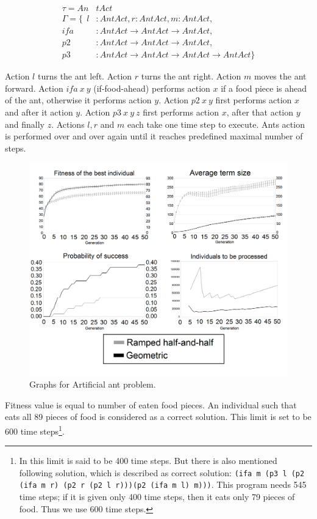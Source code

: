 \documentclass[conference]{IEEEtran}
\newcommand{\ar}{\rightarrow\xspace}
\begin{document}
\begin{align*}
\tau = An&tAct\\
\Gamma = \{~~
  l    &: AntAct                              ,
  r    : AntAct                               ,
  m    : AntAct                               ,\\
  ifa  &: AntAct \ar AntAct \ar AntAct  ,\\
  p2   &: AntAct \ar AntAct \ar AntAct  ,\\
  p3   &: AntAct \ar AntAct \ar AntAct \ar AntAct  \}
\end{align*}

Action $l$ turns the ant left. 
Action $r$ turns the ant right.
Action $m$ moves the ant forward.
Action $ifa~x~y$ (if-food-ahead) performs action $x$ 
if a food piece is ahead of the ant,
otherwise it performs action $y$.
Action $p2~x~y$ first performs action $x$ and after it action $y$.
Action $p3~x~y~z$ first performs action $x$, 
after that action $y$ and finally $z$.
Actions $l, r$ and $m$ each take one time step to execute.
Ants action is performed over and over again until it reaches predefined
maximal number of steps. 

\begin{figure}[h!]
  \caption{Graphs for Artificial ant problem.}
  \centering
    \includegraphics[scale=0.15]{imgs/cec/ANT.PNG}
\end{figure}

Fitness value is equal to number of eaten food pieces.
An individual such that eats all 89 pieces of food is 
considered as a correct solution.
This limit is set to be 600 time steps\footnote{
In \cite{koza92} this limit is said to be 400 time steps.
But there is also mentioned following solution, 
which is described as correct solution:
\texttt{(ifa m (p3 l (p2 (ifa m r) (p2 r (p2 l r)))(p2 (ifa m l) m)))}.
This program needs 545
time steps; if it is given only 400 time steps, then it eats only 79 pieces
of food. Thus we use 600 time steps. 
}.
\end{document}

